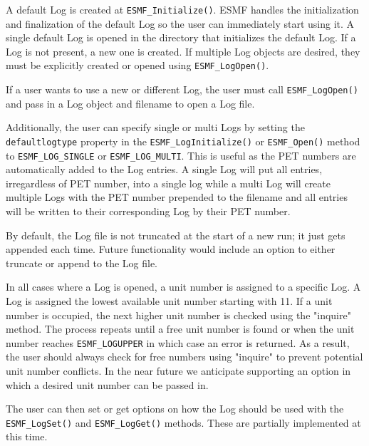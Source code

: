 

A default Log is created at {\tt ESMF\_Initialize()}.  ESMF handles the 
initialization and finalization of the default Log so the user can immediately
start using it.  A single default Log is opened in the directory that 
initializes the default Log.  If a Log is not present, a new one is created.
If multiple Log objects are desired, they must be explicitly created or opened 
using {\tt ESMF\_LogOpen()}.

If a user wants to use a new or different Log, the user must call
{\tt ESMF\_LogOpen()} and pass in a Log object and filename to open a Log file.

Additionally,  the user can specify single or multi Logs by setting the
{\tt defaultlogtype} property in the {\tt ESMF\_LogInitialize()} or 
{\tt ESMF\_Open()} method to {\tt ESMF\_LOG\_SINGLE} or {\tt ESMF\_LOG\_MULTI}.
This is useful as the PET numbers are automatically added to the Log entries.
A single Log will put all entries, irregardless of PET number, into a single
log while a multi Log will create multiple Logs with the PET number prepended
to the filename and all entries will be written to their corresponding Log 
by their PET number.
 
By default, the Log file is not truncated at the start of a new run; it just
gets appended each time.  Future functionality would include an option to
either truncate or append to the Log file. 

In all cases where a Log is opened, a unit number is assigned to a specific
Log.  A Log is assigned the lowest available unit number starting with
11.  If a unit number is occupied, the next higher unit number is 
checked using the "inquire" method.  The process repeats until a free unit 
number is found or when the unit number reaches {\tt ESMF\_LOGUPPER} in 
which case an error is returned.  As a result, the user should always check
for free numbers using "inquire" to prevent potential unit number conflicts.
In the near future we anticipate supporting an option in which a desired
unit number can be passed in.

The user can then set or get options on how the Log should be used 
with the {\tt ESMF\_LogSet()} and {\tt ESMF\_LogGet()} methods.  These are 
partially implemented at this time. 

